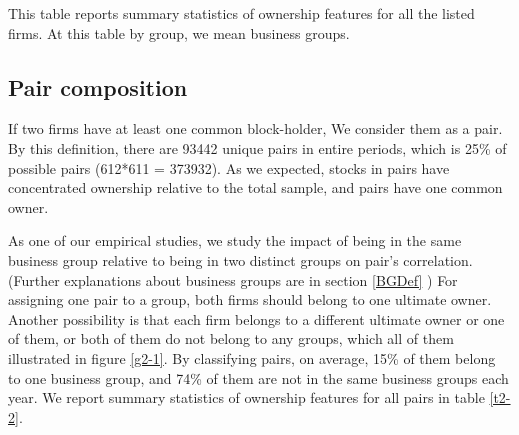 	{	 \begin{table}[htbp]
		\centering
		\caption{ This table reports summary statistics of ownership features for all the listed firms. At this table by group, we mean business groups.}
		\label{t2-1}
		\resizebox{1\textwidth}{!}
		{
			
		}
\end{table}}




\subsection{{Pair composition} }

	If two firms have at least one common block-holder, We consider them as a pair. By this definition, there are 93442  unique pairs in entire periods, which is 25\% of possible pairs (612*611 = 373932). As we expected, stocks in pairs have concentrated ownership relative to the total sample, and pairs have one common owner.
	
	\normalcolor
	
	As one of our empirical studies, we study the impact of being in the same business group relative to being in two distinct groups on pair's correlation. (Further explanations about business groups are in section \ref{BGDef} )
	For assigning one pair to a group, both firms should belong to one ultimate owner. Another possibility is that each firm belongs to a different ultimate owner or one of them, or both of them do not belong to any groups, which all of them illustrated in figure \ref{g2-1}.
	By classifying pairs, on average, 15\% of them  belong to one business group, and 74\% of them are not in the same business groups  each year. We report summary statistics of ownership features for all pairs in table \ref{t2-2}.
	
